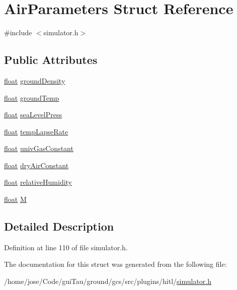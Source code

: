 \hypertarget{struct_air_parameters}{\section{Air\-Parameters Struct Reference}
\label{struct_air_parameters}
}


{\ttfamily \#include $<$simulator.\-h$>$}

\subsection*{Public Attributes}
\begin{DoxyCompactItemize}
\item 
\hyperlink{_super_l_u_support_8h_a6a1bb6ed41f44b60e7bd83b0e9945aa7}{float} \hyperlink{group___h_i_t_l_plugin_ga450ddae855377cbc0ce591c7703bcf3f}{ground\-Density}
\item 
\hyperlink{_super_l_u_support_8h_a6a1bb6ed41f44b60e7bd83b0e9945aa7}{float} \hyperlink{group___h_i_t_l_plugin_gab28b8a30520fdf84e924254a8e7f0167}{ground\-Temp}
\item 
\hyperlink{_super_l_u_support_8h_a6a1bb6ed41f44b60e7bd83b0e9945aa7}{float} \hyperlink{group___h_i_t_l_plugin_gad886dc623ba9dd1cb06beeb950791c7a}{sea\-Level\-Press}
\item 
\hyperlink{_super_l_u_support_8h_a6a1bb6ed41f44b60e7bd83b0e9945aa7}{float} \hyperlink{group___h_i_t_l_plugin_gae5608554d84c53cb81499d63b9381f9f}{temp\-Lapse\-Rate}
\item 
\hyperlink{_super_l_u_support_8h_a6a1bb6ed41f44b60e7bd83b0e9945aa7}{float} \hyperlink{group___h_i_t_l_plugin_gaf6cf658bcff6f341c341ba3f6194761c}{univ\-Gas\-Constant}
\item 
\hyperlink{_super_l_u_support_8h_a6a1bb6ed41f44b60e7bd83b0e9945aa7}{float} \hyperlink{group___h_i_t_l_plugin_ga343d7519080c3b70a59e554bfc2ed57d}{dry\-Air\-Constant}
\item 
\hyperlink{_super_l_u_support_8h_a6a1bb6ed41f44b60e7bd83b0e9945aa7}{float} \hyperlink{group___h_i_t_l_plugin_ga259002c03d3dec62e3af14ded35e5bfd}{relative\-Humidity}
\item 
\hyperlink{_super_l_u_support_8h_a6a1bb6ed41f44b60e7bd83b0e9945aa7}{float} \hyperlink{group___h_i_t_l_plugin_gaa24db2a922b9f638fdaacad6e3f4fb91}{M}
\end{DoxyCompactItemize}


\subsection{Detailed Description}


Definition at line 110 of file simulator.\-h.



The documentation for this struct was generated from the following file\-:\begin{DoxyCompactItemize}
\item 
/home/jose/\-Code/gui\-Tau/ground/gcs/src/plugins/hitl/\hyperlink{simulator_8h}{simulator.\-h}\end{DoxyCompactItemize}
